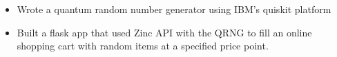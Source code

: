 
\begin{itemize}
    \item Wrote a quantum random number generator using IBM’s quiskit platform
    \item Built a flask app that used Zinc API with the QRNG to fill an online shopping cart with random items at a specified price point.
\end{itemize}